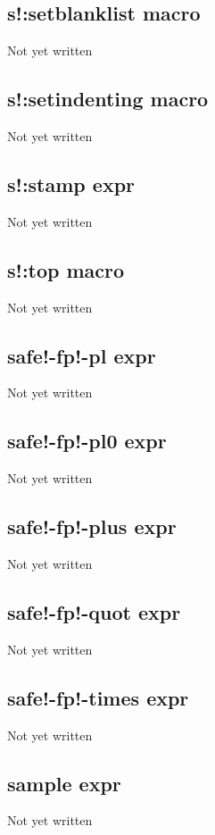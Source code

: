 \documentclass[a4paper,11pt]{article}
\begin{document}
{\subsection{\ttfamily s!:setblanklist macro}
   Not yet written

\subsection{\ttfamily s!:setindenting macro}
   Not yet written

\subsection{\ttfamily s!:stamp expr}
   Not yet written

\subsection{\ttfamily s!:top macro}
   Not yet written

\subsection{\ttfamily safe!-fp!-pl expr}
   Not yet written

\subsection{\ttfamily safe!-fp!-pl0 expr}
   Not yet written

\subsection{\ttfamily safe!-fp!-plus expr}
   Not yet written

\subsection{\ttfamily safe!-fp!-quot expr}
   Not yet written

\subsection{\ttfamily safe!-fp!-times expr}
   Not yet written

\subsection{\ttfamily sample expr}
   Not yet written

}
\end{document}
